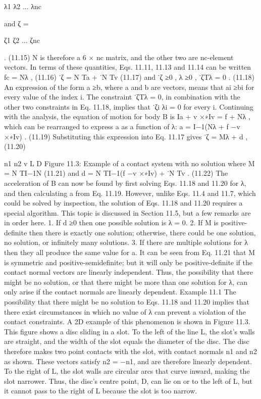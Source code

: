 λ1 λ2 ... λnc

and ζ =

ζ1 ζ2 ... ζnc

. (11.15) N is therefore a 6 × nc matrix, and the other two are nc-element vectors. In terms of these quantities, Eqs. 11.11, 11.13 and 11.14 can be written fc = Nλ , (11.16) ˙ζ = N Ta + ˙N Tv (11.17) and ˙ζ ≥0 , λ ≥0 , ˙ζTλ = 0 . (11.18) An expression of the form a ≥b, where a and b are vectors, means that ai ≥bi for every value of the index i. The constraint ˙ζTλ = 0, in combination with the other two constraints in Eq. 11.18, implies that ˙ζi λi = 0 for every i. Continuing with the analysis, the equation of motion for body B is Ia + v ×∗Iv = f + Nλ , which can be rearranged to express a as a function of λ: a = I−1(Nλ + f −v ×∗Iv) . (11.19) Substituting this expression into Eq. 11.17 gives ˙ζ = Mλ + d , (11.20)

n1 n2 v L D Figure 11.3: Example of a contact system with no solution where M = N TI−1N (11.21) and d = N TI−1(f −v ×∗Iv) + ˙N Tv . (11.22) The acceleration of B can now be found by first solving Eqs. 11.18 and 11.20 for λ, and then calculating a from Eq. 11.19. However, unlike Eqs. 11.4 and 11.7, which could be solved by inspection, the solution of Eqs. 11.18 and 11.20 requires a special algorithm. This topic is discussed in Section 11.5, but a few remarks are in order here. 1. If d ≥0 then one possible solution is λ = 0. 2. If M is positive-definite then there is exactly one solution; otherwise, there could be one solution, no solution, or infinitely many solutions. 3. If there are multiple solutions for λ then they all produce the same value for a. It can be seen from Eq. 11.21 that M is symmetric and positive-semidefinite; but it will only be positive-definite if the contact normal vectors are linearly independent. Thus, the possibility that there might be no solution, or that there might be more than one solution for λ, can only arise if the contact normals are linearly dependent. Example 11.1 The possibility that there might be no solution to Eqs. 11.18 and 11.20 implies that there exist circumstances in which no value of λ can prevent a violation of the contact constraints. A 2D example of this phenomenon is shown in Figure 11.3. This figure shows a disc sliding in a slot. To the left of the line L, the slot’s walls are straight, and the width of the slot equals the diameter of the disc. The disc therefore makes two point contacts with the slot, with contact normals n1 and n2 as shown. These vectors satisfy n2 = −n1, and are therefore linearly dependent. To the right of L, the slot walls are circular arcs that curve inward, making the slot narrower. Thus, the disc’s centre point, D, can lie on or to the left of L, but it cannot pass to the right of L because the slot is too narrow.

